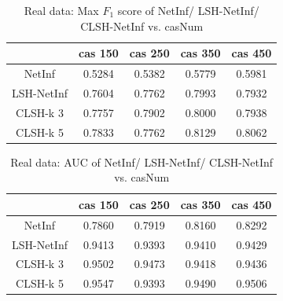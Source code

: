\begin{itemize}
\begin{table}[H]
\caption{Real data: Max $F_1$ score of NetInf/  LSH-NetInf/ CLSH-NetInf vs. casNum}
\begin{tabular}{c|c|c|c|c}
 & cas 150 & cas 250 & cas 350 & cas 450 \\
 \hline
 NetInf & 0.5284 & 0.5382 & 0.5779 & 0.5981 \\
 LSH-NetInf & 0.7604 & 0.7762 & 0.7993 & 0.7932 \\
 CLSH-k 3 & 0.7757 & 0.7902 & 0.8000 & 0.7938 \\
 CLSH-k 5 & 0.7833 & 0.7762 & 0.8129 & 0.8062
\end{tabular}\label{tab:rwdLSHnetinfCASf1}
\end{table}
\begin{table}[H]
\caption{Real data: AUC of NetInf/ LSH-NetInf/ CLSH-NetInf vs. casNum}
\begin{tabular}{c|c|c|c|c}
 & cas 150 & cas 250 & cas 350 & cas 450 \\
 \hline
 NetInf & 0.7860 & 0.7919 & 0.8160 & 0.8292 \\
 LSH-NetInf & 0.9413 & 0.9393 & 0.9410 & 0.9429 \\
 CLSH-k 3 & 0.9502 & 0.9473 & 0.9418 & 0.9436 \\
 CLSH-k 5 & 0.9547 & 0.9393 & 0.9490 & 0.9506
\end{tabular}\label{tab:rwdLSHnetinfCASauc}
\end{table}
\end{itemize}